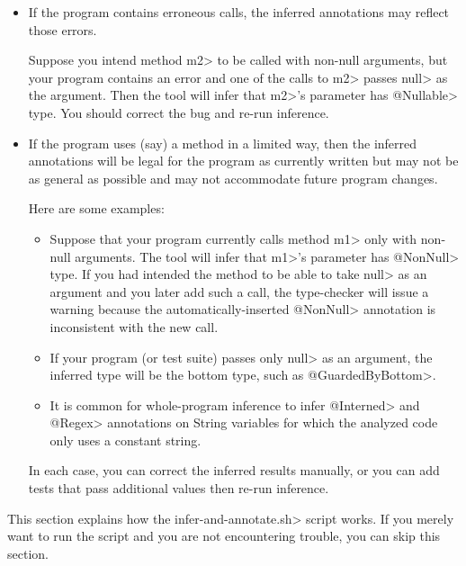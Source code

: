 \begin{itemize}
\item
If the program contains erroneous calls, the
inferred annotations may reflect those errors.

Suppose you intend method \<m2> to be called with
non-null arguments, but your program contains an error and one of the calls
to \<m2> passes \<null> as the argument.  Then the tool will infer that
\<m2>'s parameter has \<@Nullable> type.
You should correct the bug and re-run inference.

\item
If the program uses (say) a method in a limited way, then the inferred
annotations will be legal for the program as
currently written but may not be as general as possible and may not
accommodate future program changes.

Here are some examples:

\begin{itemize}
\item
Suppose that your program currently calls
method \<m1> only with non-null
arguments.  The tool will infer that \<m1>'s parameter has
\<@NonNull> type.  If you had intended the method to be able to
take \<null> as an argument and you later add such a call, the type-checker
will issue a warning because the automatically-inserted \<@NonNull>
annotation is inconsistent with the new call.

\item
If your program (or test suite) passes only \<null> as an argument, the
inferred type will be the bottom type, such as \<@GuardedByBottom>.

\item
It is common for whole-program inference to infer
\<@Interned> and \<@Regex> annotations on String variables for which the
analyzed code only uses a constant string.

\end{itemize}

In each case, you can correct the inferred results manually, or you can
add tests that pass additional values then re-run inference.

\end{itemize}



This section explains how the \<infer-and-annotate.sh> script works.  If you
merely want to run the script and you are not encountering trouble, you can
skip this section.

